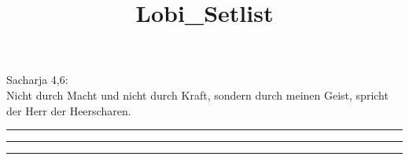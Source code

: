 \documentclass[12pt,a4paper,oneside,final,ngerman]{scrartcl}
\title{Lobi\_Setlist}
\begin{document}
\pagestyle{myheadings}

Sacharja 4,6:\\
Nicht durch Macht und nicht durch Kraft, sondern durch meinen Geist, spricht der Herr der Heerscharen.

\vspace{1cm}
\hrule
\vspace{1cm}






\hrule
\vspace{1cm}




\hrule
\end{document}
